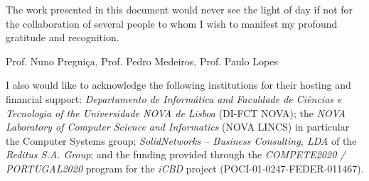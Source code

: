 \acknowledgements

The work presented in this document would never see the light of day if not for the collaboration of several people to whom I wish to manifest my profound gratitude and recognition.

Prof. Nuno Preguiça, Prof. Pedro Medeiros, Prof. Paulo Lopes


I also would like to acknowledge the following institutions for their hosting and financial support: \textit{Departamento de Informática and Faculdade de Ciências e Tecnologia of the Universidade NOVA de Lisboa} (DI-FCT NOVA); the \textit{NOVA Laboratory of Computer Science and Informatics} (NOVA LINCS) in particular the Computer Systems group; \textit{SolidNetworks – Business Consulting, LDA} of the \textit{Reditus S.A. Group}; and the funding provided through the \textit{COMPETE2020 / PORTUGAL2020} program for the \textit{iCBD} project (POCI-01-0247-FEDER-011467).